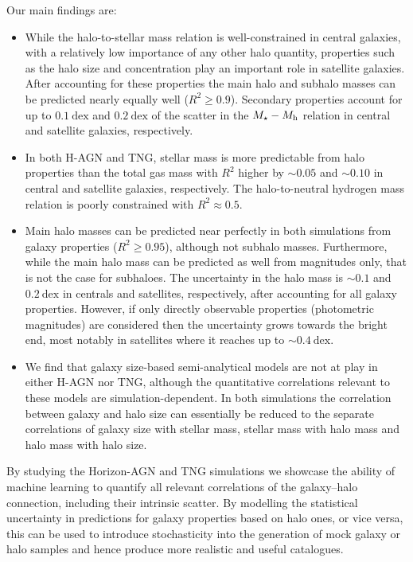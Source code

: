 \documentclass[useAMS,usenatbib]{mnras}
\begin{document}
Our main findings are:
\begin{itemize}
    \item While the halo-to-stellar mass relation is well-constrained in central galaxies, with a relatively low importance of any other halo quantity, properties such as the halo size and concentration play an important role in satellite galaxies. After accounting for these properties the main halo and subhalo masses can be predicted nearly equally well ($R^2 \geq 0.9$). Secondary properties account for up to $0.1~\mathrm{dex}$ and $0.2~\mathrm{dex}$ of the scatter in the $M_\star - M_{\rm h}$ relation in central and satellite galaxies, respectively.
    \item In both H-AGN and TNG, stellar mass is more predictable from halo properties than the total gas mass with $R^2$ higher by $\sim0.05$ and $\sim0.10$ in central and satellite galaxies, respectively. The halo-to-neutral hydrogen mass relation is poorly constrained with $R^2\approx0.5$.
    \item Main halo masses can be predicted near perfectly in both simulations from galaxy properties ($R^2 \geq 0.95$), although not subhalo masses. Furthermore, while the main halo mass can be predicted as well from magnitudes only, that is not the case for subhaloes. The uncertainty in the halo mass is $\sim0.1$ and $0.2~\mathrm{dex}$ in centrals and satellites, respectively, after accounting for all galaxy properties. However, if only directly observable properties (photometric magnitudes) are considered then the uncertainty grows towards the bright end, most notably in satellites where it reaches up to $\sim0.4~\mathrm{dex}$.
    \item We find that galaxy size-based semi-analytical models are not at play in either H-AGN nor TNG, although the quantitative correlations relevant to these models are simulation-dependent. In both simulations the correlation between galaxy and halo size can essentially be reduced to the separate correlations of galaxy size with stellar mass, stellar mass with halo mass and halo mass with halo size.
\end{itemize}

By studying the Horizon-AGN and TNG simulations we showcase the ability of machine learning to quantify all relevant correlations of the galaxy--halo connection, including their intrinsic scatter. By modelling the statistical uncertainty in predictions for galaxy properties based on halo ones, or vice versa, this can be used to introduce stochasticity into the generation of mock galaxy or halo samples and hence produce more realistic and useful catalogues.
\end{document}
